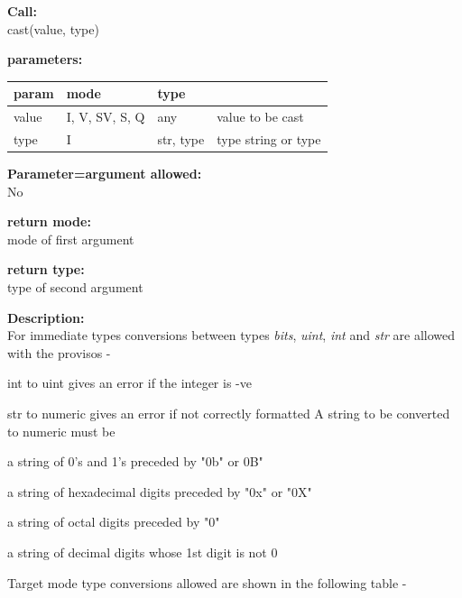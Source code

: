         {\bf Call:} \\
        cast(value, type)
        
        {\bf parameters:} \\
        \begin{tabular}{| l | l | l | l |}
        \hline
        param  & mode & type & \\
        \hline \hline
        value & I, V, SV, S, Q & any       & value to be cast    \\ \hline
        type  & I              & str, type & type string or type \\ \hline
        \end{tabular}
        
        {\bf Parameter=argument allowed:} \\
        No
        
        {\bf return mode:} \\
        mode of first argument

        {\bf return type:} \\
        type of second argument
        
        {\bf Description:} \\
        For immediate types conversions between types {\em bits}, {\em uint},
        {\em int} and {\em str} are allowed with the provisos -
        \blist
        \item   int to uint gives an error if the integer is -ve
        \item   str to numeric gives an error if not correctly formatted
        \blend
        A string to be converted to numeric must be
        \blist
        \item   a string of 0's and 1's preceded by "0b" or 0B"
        \item   a string of hexadecimal digits preceded by "0x" or "0X"
        \item   a string of octal digits preceded by "0"
        \item   a string of decimal digits whose 1st digit is not 0
        \blend


        Target mode type conversions allowed are shown in the following
        table -

